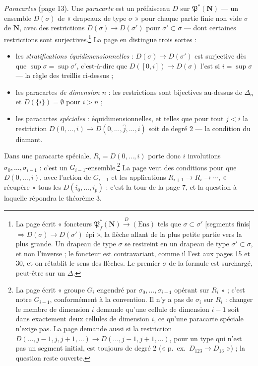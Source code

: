 \documentclass[11pt,a4paper]{article}
\begin{document}
\emph{Paracartes} (page 13). Une \emph{paracarte} est un préfaisceau $D$ sur
$\mathfrak{P}^*(\mathbf{N})$ --- un ensemble $D(\sigma)$ de « drapeaux de
type $\sigma$ » pour chaque partie finie non vide $\sigma$ de $\mathbf{N}$,
avec des restrictions $D(\sigma) \to D(\sigma')$ pour $\sigma' \subset
\sigma$ --- dont certaines restrictions sont surjectives.\footnote{La page
écrit « foncteurs $\mathfrak{P}_f^*(\mathbf{N}) \xrightarrow{D} (\mathrm{Ens})$
tels que $\sigma \subset \sigma'$ [segments finis] $\Rightarrow D(\sigma) \to
D(\sigma')$ épi », la flèche allant de la plus petite partie vers la plus
grande. Un drapeau de type $\sigma$ se restreint en un drapeau de type $\sigma'
\subset \sigma$, et non l'inverse ; le foncteur est contravariant, comme il
l'est aux pages 15 et 30, et on rétablit le sens des flèches. Le premier
$\sigma$ de la formule est surchargé, peut-être sur un $\Delta$.} La page en
distingue trois sortes :
\begin{itemize}
  \item les \emph{stratifications équidimensionnelles} : $D(\sigma) \to
  D(\sigma')$ est surjective dès que $\sup \sigma = \sup \sigma'$,
  c'est-à-dire que $D([0, i]) \to D(\sigma)$ l'est si $i = \sup \sigma$ ---
  la règle des treillis ci-dessus ;
  \item les paracartes \emph{de dimension $n$} : les restrictions sont
  bijectives au-dessus de $\Delta_n$ et $D(\{i\}) = \emptyset$ pour $i > n$ ;
  \item les paracartes \emph{spéciales} : équidimensionnelles, et telles que
  pour tout $j < i$ la restriction $D(0, \ldots, i) \to D(0, \ldots,
  \widehat{j}, \ldots, i)$ soit de degré 2 --- la condition du diamant.
\end{itemize}
Dans une paracarte spéciale, $R_i = D(0, \ldots, i)$ porte donc $i$
involutions $\sigma_0, \ldots, \sigma_{i-1}$ : c'est un
$G_{i-1}$-ensemble.\footnote{La page écrit « groupe $G_i$ engendré par
$\sigma_0, \ldots, \sigma_{i-1}$ opérant sur $R_i$ » ; c'est notre $G_{i-1}$,
conformément à la convention. Il n'y a pas de $\sigma_i$ sur $R_i$ : changer
le membre de dimension $i$ demande qu'une cellule de dimension $i - 1$ soit
dans exactement deux cellules de dimension $i$, ce qu'une paracarte spéciale
n'exige pas. La page demande aussi si la restriction $D(\ldots, j-1, j, j+1,
\ldots) \to D(\ldots, j-1, j+1, \ldots)$, pour un type qui n'est pas un
segment initial, est toujours de degré 2 (« p.\ ex.\ $D_{123} \to D_{13}$ ») ;
la question reste ouverte.} La page veut des conditions pour que $D(0,
\ldots, i)$, avec l'action de $G_{i-1}$ et les applications $R_{i+1} \to R_i
\to \cdots$, « récupère » tous les $D(i_0, \ldots, i_p)$ : c'est la tour de la
page 7, et la question à laquelle répondra le théorème 3.
\end{document}
